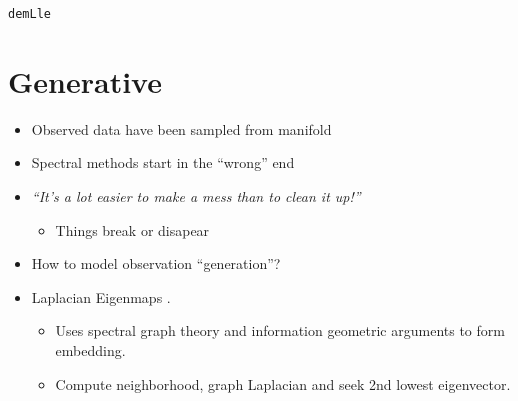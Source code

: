 \texttt{demLle}

\section{Generative}
\begin{itemize}
\item Observed data have been sampled from manifold 
\item Spectral methods start in the {}``wrong'' end 
\item \textit{{}``It's a lot easier to make a mess than to clean it up!''} 

\begin{itemize}
\item Things break or disapear 
\end{itemize}
\item How to model observation {}``generation''? 
\item Laplacian Eigenmaps \cite{Belkin:laplacian03}.

\begin{itemize}
\item Uses spectral graph theory and information geometric arguments to
form embedding.
\item Compute neighborhood, graph Laplacian and seek 2nd lowest eigenvector.
\end{itemize}
\end{itemize}



